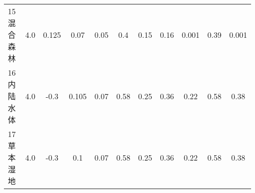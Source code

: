\begin{sidewaystable}[]
\begin{tabular}{@{}lcccccccccc@{}}
        15 混合森林    & 4.0        & 0.125                                                                        & 0.07                                                                                                            & 0.05                                                                                                            & 0.4                                                                                                             & 0.15                                                                                                            & 0.16                                                                                                            & 0.001                                                                                                           & 0.39                                                                                                            & 0.001                                                                                                           \\
        16 内陆水体    & 4.0        & -0.3                                                                         & 0.105                                                                                                           & 0.07                                                                                                            & 0.58                                                                                                            & 0.25                                                                                                            & 0.36                                                                                                            & 0.22                                                                                                            & 0.58                                                                                                            & 0.38                                                                                                            \\
        17 草本湿地    & 4.0        & -0.3                                                                         & 0.1                                                                                                             & 0.07                                                                                                            & 0.58                                                                                                            & 0.25                                                                                                            & 0.36                                                                                                            & 0.22                                                                                                            & 0.58                                                                                                            & 0.38                                                                                                            \\

\end{tabular}
\end{sidewaystable}
